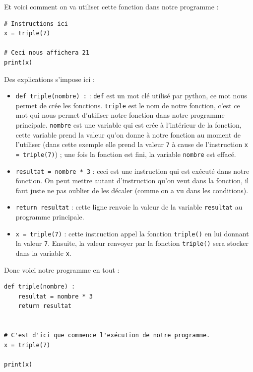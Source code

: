 \documentclass[12pt]{article}
\newcommand{\code}[1]{\colorbox{light-gray}{\texttt{#1}}}
\begin{document}
            Et voici comment on va utiliser cette fonction dans notre programme :
            \begin{lstlisting}[style=code]
# Instructions ici
x = triple(7)

# Ceci nous affichera 21
print(x)
            \end{lstlisting}

            Des explications s'impose ici :
            \begin{itemize}
                \item \code{def triple(nombre) :} : \code{def} est un mot clé utilisé par python, ce mot nous
                    permet de crée les fonctions. \code{triple} est le nom de notre fonction, c'est ce
                    mot qui nous permet d'utiliser notre fonction dans notre programme principale. \code{nombre}
                    est une variable qui est crée à l'intérieur de la fonction, cette variable prend la valeur qu'on
                    donne à notre fonction au moment de l'utiliser (dans cette exemple elle prend la valeur \code{7}
                    à cause de l'instruction \code{x = triple(7)}) ; une fois la fonction est fini, la variable
                    \code{nombre} est effacé.

                \item \code{resultat = nombre * 3} : ceci est une instruction qui est exécuté dans notre fonction.
                    On peut mettre autant d'instruction qu'on veut dans la fonction, il faut juste ne pas oublier de
                    les décaler (comme on a vu dans les conditions).
                \item \code{return resultat} : cette ligne renvoie la valeur de la variable \code{resultat} au
                    programme principale.
                \item \code{x = triple(7)} : cette instruction appel la fonction \code{triple()} en lui donnant la
                    valeur \code{7}. Ensuite, la valeur renvoyer par la fonction \code{triple()} sera stocker dans
                    la variable \code{x}.
            \end{itemize}

            Donc voici notre programme en tout :
            \begin{lstlisting}[style=code]
def triple(nombre) :
    resultat = nombre * 3
    return resultat


# C'est d'ici que commence l'exécution de notre programme.
x = triple(7)

print(x)
            \end{lstlisting}
\end{document}

